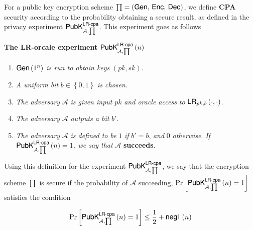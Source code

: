\documentclass[../CryptoFinal.tex]{subfiles}
\begin{document}
\begin{flushleft}



  For a public key encryption scheme $\prod = \left( \text{{\fontfamily{phv}\selectfont Gen}}, \, \text{{\fontfamily{phv}\selectfont Enc}}, \, \text{{\fontfamily{phv}\selectfont Dec}} \right)$, we define \textbf{CPA} security according to the probability obtaining a secure result, as defined in the privacy experiment $\text{{\fontfamily{phv}\selectfont PubK}}^{\text{{\fontfamily{phv}\selectfont LR-cpa}}}_{\mathcal{A}, \prod}$.  This experiment goes as follows \newline


\textbf{The LR-orcale experiment} $\text{{\fontfamily{phv}\selectfont PubK}}^{\text{{\fontfamily{phv}\selectfont LR-cpa}}}_{\mathcal{A}, \prod} \left( n \right)$

\begin{enumerate}
  \item $\text{{\fontfamily{phv}\selectfont Gen}} \left( 1^n \right)$ \emph{is run to obtain keys} $\left( pk, sk \right)$.
  \item \emph{A uniform bit} $b \in \left\{ 0, 1 \right\}$ \emph{is chosen}.
  \item \emph{The adversary} $\mathcal{A}$ \emph{is given input} $pk$ \emph{and oracle access to} $\text{{\fontfamily{phv}\selectfont LR}}_{pk,b} \left( \cdot , \cdot \right)$.
  \item \emph{The adversary} $\mathcal{A}$ \emph{outputs a bit} $b'$.
  \item \emph{The adversary} $\mathcal{A}$ \emph{is defined to be} $1$ \emph{if} $b' = b$, \emph{and} $0$ \emph{otherwise}.  \emph{If} $\text{{\fontfamily{phv}\selectfont PubK}}^{\text{{\fontfamily{phv}\selectfont LR-cpa}}}_{\mathcal{A}, \prod} \left( n \right) = 1$, \emph{we say that} $\mathcal{A}$ \textbf{succeeds}.
\end{enumerate}

Using this definition for the experiment $\text{{\fontfamily{phv}\selectfont PubK}}^{\text{{\fontfamily{phv}\selectfont LR-cpa}}}_{\mathcal{A}, \prod}$, we say that the encryption scheme $\prod$ is secure if the probability of $\mathcal{A}$ succeeding, $\Pr \left[ \text{{\fontfamily{phv}\selectfont PubK}}^{\text{{\fontfamily{phv}\selectfont LR-cpa}}}_{\mathcal{A}, \prod} \left( n \right) = 1 \right]$ satisfies the condition 

\begin{align}
  \Pr \left[ \text{{\fontfamily{phv}\selectfont PubK}}^{\text{{\fontfamily{phv}\selectfont LR-cpa}}}_{\mathcal{A}, \prod} \left( n \right) = 1 \right] \leq \frac{1}{2} + \text{{\fontfamily{phv}\selectfont negl }} \left( n \right) \label{eq8a}
\end{align}


\end{flushleft}
\end{document}
